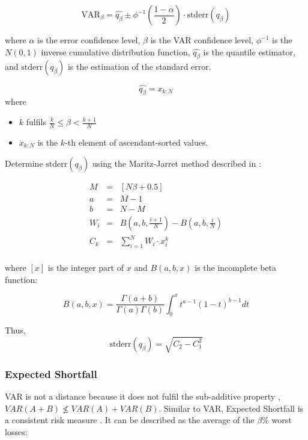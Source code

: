 \documentclass[a4paper,12pt,final]{article}
\begin{document}
\begin{displaymath}
\textrm{VAR}_{\beta} = \widehat{q_{\beta}} \pm \phi^{-1}\left(\frac{1-\alpha}{2}\right) \cdot \textrm{stderr}(q_{\beta})
\end{displaymath}

where $\alpha$ is the error confidence level, $\beta$ is the VAR confidence 
level, $\phi^{-1}$ is the $N(0,1)$ inverse cumulative distribution function, 
$\widehat{q_{\beta}}$ is the quantile estimator, and $\textrm{stderr}(q_{\beta})$
is the estimation of the standard error.

\begin{displaymath}
\widehat{q_{\beta}} = x_{k:N}
\end{displaymath}
where
\begin{itemize}
\item $k$ fulfils $\frac{k}{N} \leq \beta < \frac{k+1}{N}$
\item $x_{k:N}$ is the $k$-th element of ascendant-sorted values.
\end{itemize}

Determine $\textrm{stderr}(q_{\beta})$ using the Maritz-Jarret method described
in \cite{quant:algor}:

\begin{displaymath}
\begin{array}{rcl}
M   & = & [N \beta + 0.5]  \\
a   & = & M - 1            \\
b   & = & N - M            \\
W_i & = & B(a,b,\frac{i+1}{N}) - B(a,b,\frac{i}{N}) \\
C_k & = & \sum_{i=1}^{N} W_i \cdot x_i^k \\
\end{array}
\end{displaymath}

where $[x]$ is the integer part of $x$ and $B(a,b,x)$ is the incomplete beta 
function:

\begin{displaymath}
B(a,b,x)=\frac{\Gamma(a+b)}{\Gamma(a)\Gamma(b)}\int_0^x t^{a-1} (1-t)^{b-1} dt
\end{displaymath}

Thus,
\begin{displaymath}
\textrm{stderr}(q_{\beta}) = \sqrt{C_2 - C_1^2}
\end{displaymath}

\subsubsection{Expected Shortfall}
VAR is not a distance because it does not fulfil the sub-additive property 
\cite{var:varbad}, $VAR(A+B) \nleq VAR(A)+VAR(B)$. Similar to VAR, Expected 
Shortfall is a consistent risk measure \cite{var:eshortfall}. It can be described
as the average of the $\beta\%$ worst losses:
\end{document}
